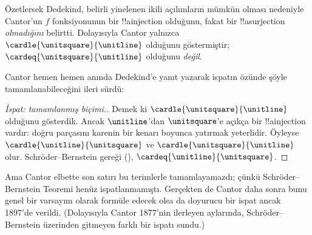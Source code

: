 \documentclass[../../../include/open-logic-section]{subfiles}
\begin{document}
Özetlersek Dedekind, belirli yinelenen ikili açılımların mümkün olması
nedeniyle Cantor'un $f$ fonksiyonunun bir !!a{injection} olduğunu, fakat bir
!!a{surjection} \emph{olmadığını} belirtti. Dolayısıyla Cantor yalnızca
$\cardle{\unitsquare}{\unitline}$ olduğunu göstermiştir;
$\cardeq{\unitsquare}{\unitline}$ olduğunu \emph{değil}.

Cantor hemen hemen anında Dedekind'e yanıt yazarak ispatın özünde şöyle
tamamlanabileceğini ileri sürdü:

\begin{proof}[İspat: tamamlanmış biçimi.] 
Demek ki $\cardle{\unitsquare}{\unitline}$ olduğunu gösterdik. Ancak
$\unitline$'dan $\unitsquare$'e açıkça bir !!a{injection} vardır: doğru
parçasını karenin bir kenarı boyunca yatırmak yeterlidir. Öyleyse
$\cardle{\unitline}{\unitsquare}$ ve
$\cardle{\unitsquare}{\unitline}$ olur. Schr\"{o}der--Bernstein gereği
(),
$\cardeq{\unitline}{\unitsquare}$.
\end{proof}

Ama Cantor elbette son satırı bu terimlerle tamamlayamazdı; çünkü
Schr\"{o}der--Bernstein Teoremi henüz ispatlanmamıştı. Gerçekten de Cantor
daha sonra bunu genel bir varsayım olarak formüle edecek olsa da doyurucu bir
ispat ancak 1897'de verildi. (Dolayısıyla Cantor 1877'nin ilerleyen
aylarında, Schr\"{o}der--Bernstein üzerinden gitmeyen farklı bir
 ispatı sundu.)
\end{document}
